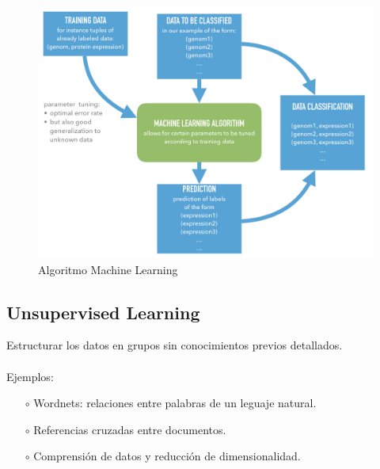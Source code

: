 \documentclass[12pt,a4paper]{book}
\begin{document}
\begin{figure}[hbtp]
\centering
\includegraphics[scale=0.4]{Graficas/SL_1.jpg}
\caption{Algoritmo Machine Learning}
\end{figure}

\subsection{Unsupervised Learning}
Estructurar los datos en grupos sin conocimientos previos detallados.\\
\\
Ejemplos:
\begin{enumerate}
 \item[$\circ$] Wordnets: relaciones entre palabras de un leguaje natural.
 \item[$\circ$] Referencias cruzadas entre documentos.
 \item[$\circ$] Comprensión de datos y reducción de dimensionalidad.
\end{enumerate}
\end{document}
